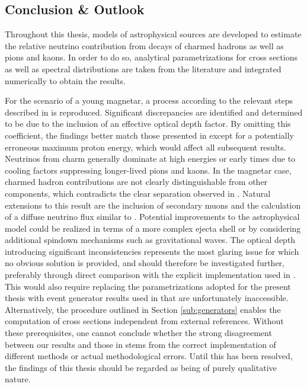 \begin{spacing}{0.980}
	\chapter{Conclusion \& Outlook}
	\label{ch:conclusion}
	
	Throughout this thesis, models of astrophysical sources are developed to estimate the relative neutrino contribution from
	decays of charmed hadrons as well as pions and kaons. In order to do so, analytical parametrizations for cross sections as well as
	spectral distributions are taken from the literature and integrated numerically to obtain the results.
	
	For the scenario of a young magnetar, a process according to the relevant steps described in \cite{Carpio_2020} is reproduced. Significant
	discrepancies are identified and determined to be due to the inclusion of an effective optical depth factor. By omitting this coefficient,
	the findings better match those presented in \cite{Carpio_2020} except for a potentially erroneous maximum proton energy, which would affect
	all subsequent results. Neutrinos from charm generally dominate at high energies or early times due to cooling factors suppressing
	longer-lived pions and kaons. In the magnetar case, charmed hadron contributions are not clearly distinguishable from other components,
	which contradicts
	the clear separation observed in \cite{Carpio_2020}. Natural extensions to this result are the inclusion of secondary muons and
	the calculation of a diffuse neutrino flux similar to \cite{Carpio_2020}. Potential improvements to the astrophysical model
	could be realized in terms of a more complex ejecta shell or by considering additional spindown mechanisms such as gravitational
	waves. The optical depth introducing significant inconsistencies represents the most glaring issue for which no obvious solution is
	provided, and should therefore be investigated further, preferably through direct comparison with the explicit implementation used in
	\cite{Carpio_2020}. This would also require replacing the parametrizations adopted for the present thesis with event
	generator results used in \cite{Carpio_2020} that are unfortunately inaccessible. Alternatively, the procedure
	outlined in Section \ref{sub:generators} enables the computation of cross sections independent from external references.
	Without these prerequisites, one cannot conclude whether the strong disagreement between our results and those in \cite{Carpio_2020}
	stems from the correct implementation of different methods or actual methodological errors. Until this has been resolved, the
	findings of this thesis should be regarded as being of purely qualitative nature.
	

\end{spacing}
